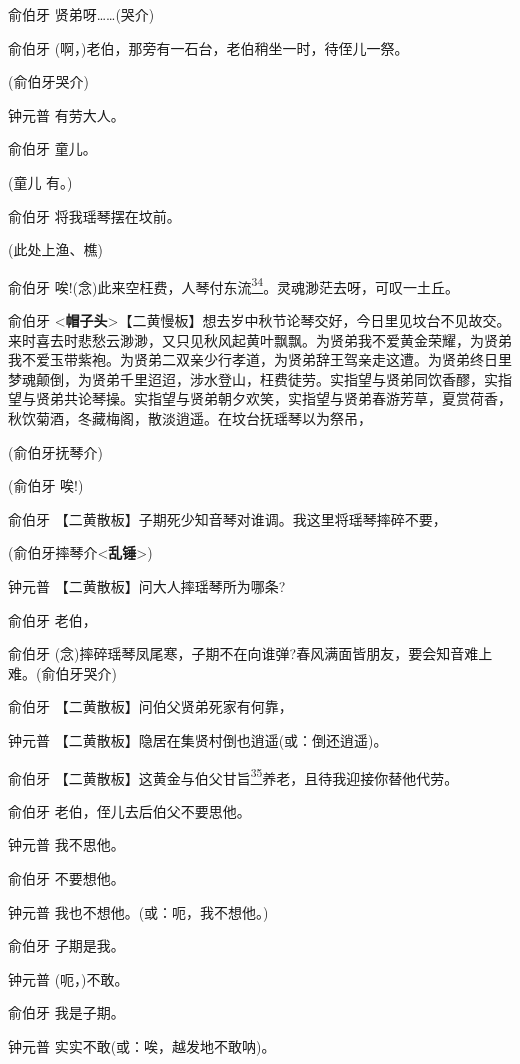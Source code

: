 俞伯牙 贤弟呀\ldots{}\ldots{}(哭介)

俞伯牙 (啊，)老伯，那旁有一石台，老伯稍坐一时，待侄儿一祭。

(俞伯牙哭介)

钟元普 有劳大人。

俞伯牙 童儿。

(童儿 有。)

俞伯牙 将我瑶琴摆在坟前。

(此处上渔、樵)

俞伯牙
唉!(念)此来空枉费，人琴付东流\protect\hyperlink{fn34}{\textsuperscript{34}}。灵魂渺茫去呀，可叹一土丘。

俞伯牙
\textless{}\textbf{帽子头}\textgreater{}【二黄慢板】想去岁中秋节论琴交好，今日里见坟台不见故交。来时喜去时悲愁云渺渺，又只见秋风起黄叶飘飘。为贤弟我不爱黄金荣耀，为贤弟我不爱玉带紫袍。为贤弟二双亲少行孝道，为贤弟辞王驾亲走这遭。为贤弟终日里梦魂颠倒，为贤弟千里迢迢，涉水登山，枉费徒劳。实指望与贤弟同饮香醪，实指望与贤弟共论琴操。实指望与贤弟朝夕欢笑，实指望与贤弟春游芳草，夏赏荷香，秋饮菊酒，冬藏梅阁，散淡逍遥。在坟台抚瑶琴以为祭吊，

(俞伯牙抚琴介)

(俞伯牙 唉!)

俞伯牙 【二黄散板】子期死少知音琴对谁调。我这里将瑶琴摔碎不要，

(俞伯牙摔琴介\textless{}\textbf{乱锤}\textgreater{})

钟元普 【二黄散板】问大人摔瑶琴所为哪条?

俞伯牙 老伯，

俞伯牙
(念)摔碎瑶琴凤尾寒，子期不在向谁弹?春风满面皆朋友，要会知音难上难。(俞伯牙哭介)

俞伯牙 【二黄散板】问伯父贤弟死家有何靠，

钟元普 【二黄散板】隐居在集贤村倒也逍遥(或：倒还逍遥)。

俞伯牙
【二黄散板】这黄金与伯父甘旨\protect\hyperlink{fn35}{\textsuperscript{35}}养老，且待我迎接你替他代劳。

俞伯牙 老伯，侄儿去后伯父不要思他。

钟元普 我不思他。

俞伯牙 不要想他。

钟元普 我也不想他。(或：呃，我不想他。)

俞伯牙 子期是我。

钟元普 (呃，)不敢。

俞伯牙 我是子期。

钟元普 实实不敢(或：唉，越发地不敢呐)。

